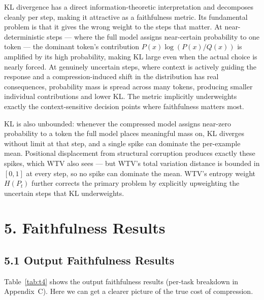 \documentclass[10pt,letterpaper]{article}
\begin{document}
KL divergence has a direct information-theoretic interpretation and
decomposes cleanly per step, making it attractive as a faithfulness
metric. Its fundamental problem is that it gives the wrong weight to the steps
that matter. At near-deterministic steps --- where the full model assigns near-certain
probability to one token --- the dominant token's contribution \(P(x)\log(P(x)/Q(x))\)
is amplified by its high probability, making KL large even when the actual choice is
nearly forced. At genuinely uncertain steps, where context is actively guiding the
response and a compression-induced shift in the distribution has real consequences,
probability mass is spread across many tokens, producing smaller individual
contributions and lower KL. The metric implicitly underweights exactly the
context-sensitive decision points where faithfulness matters most.

KL is also unbounded: whenever the compressed model assigns near-zero probability to a
token the full model places meaningful mass on, KL diverges without limit at that step,
and a single spike can dominate the per-example mean. Positional displacement from
structural corruption produces exactly these spikes, which WTV also sees --- but WTV's
total variation distance is bounded in \([0,1]\) at every step, so no spike can
dominate the mean. WTV's entropy weight \(H(P_t)\) further corrects the primary
problem by explicitly upweighting the uncertain steps that KL underweights.



\hypertarget{faithfulness-results}{%
\section{5. Faithfulness Results}\label{faithfulness-results}}

\hypertarget{output-faithfulness-results}{%
\subsection{5.1 Output Faithfulness
Results}\label{output-faithfulness-results}}

Table~\ref{tab:t4} shows the output faithfulness results (per-task breakdown in Appendix~C).  
Here we can get a clearer picture of the true cost of compression.
\end{document}
